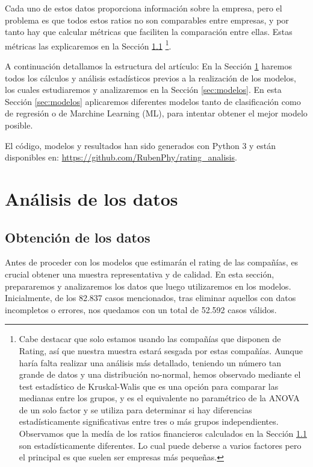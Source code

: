 \documentclass{article}
\begin{document}
Cada uno de estos datos proporciona información sobre la empresa, pero el problema es que todos estos ratios no son comparables entre empresas, y por tanto hay que calcular métricas que faciliten la comparación entre ellas. Estas métricas las explicaremos en la Sección \ref{subsec:estadisticos} \footnote{Cabe destacar que solo estamos usando las compañías que disponen de Rating, así que nuestra muestra estará sesgada por estas compañías. Aunque haría falta realizar una análisis más detallado, teniendo un número tan grande de datos y una distribución no-normal, hemos observado mediante el test estadístico de Kruskal-Walis que es una opción para comparar las medianas entre los grupos, y es el equivalente no paramétrico de la ANOVA de un solo factor y se utiliza para determinar si hay diferencias estadísticamente significativas entre tres o más grupos independientes. Observamos que la medía de los ratios financieros calculados en la Sección \ref{subsec:estadisticos} son estadísticamente diferentes. Lo cual puede deberse a varios factores pero el principal es que suelen ser empresas más pequeñas.}.

A continuación detallamos la estructura del artículo: En la Sección \ref{sec:analisis_inical} haremos todos los cálculos y análisis estadísticos previos a la realización de los modelos, los cuales estudiaremos y analizaremos en la Sección \ref{sec:modelos}. En esta Sección \ref{sec:modelos} aplicaremos diferentes modelos tanto de clasificación como de regresión o de Marchine Learning (ML), para intentar obtener el mejor modelo posible.

El código, modelos y resultados han sido generados con Python 3 y están disponibles en:  \url{https://github.com/RubenPhy/rating_analisis}.

\section{Análisis de los datos}\label{sec:analisis_inical}
\subsection{Obtención de los datos}\label{subsec:estadisticos}

Antes de proceder con los modelos que estimarán el rating de las compañías, es crucial obtener una muestra representativa y de calidad. En esta sección, prepararemos y analizaremos los datos que luego utilizaremos en los modelos. Inicialmente, de los 82.837 casos mencionados, tras eliminar aquellos con datos incompletos o errores, nos quedamos con un total de 52.592 casos válidos.
\end{document}
